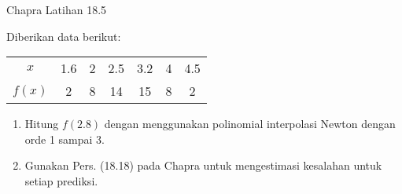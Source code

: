\begin{soal}{Chapra Latihan 18.5}

Diberikan data berikut:

{\centering
\begin{tabular}{|c|cccccc|}
\hline
$x$    & 1.6 & 2 & 2.5 & 3.2 & 4 & 4.5 \\
$f(x)$ & 2   & 8 & 14  & 15  & 8 & 2 \\
\hline
\end{tabular}
\par}

\begin{enumerate}[label=(\alph*)]
\item Hitung $f(2.8)$ dengan menggunakan polinomial interpolasi Newton dengan orde 1 sampai 3.
\item Gunakan Pers. (18.18) pada Chapra untuk mengestimasi kesalahan untuk setiap prediksi.
\end{enumerate}
\end{soal}